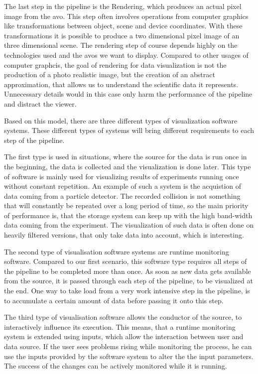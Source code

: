 The last step in the pipeline is the Rendering, which produces an actual pixel
image from the \gls{avo}. This step often involves operations from computer
graphics like transformations between object, scene and device coordinates. With
these transformations it is possible to produce a two dimensional pixel image of
an three dimensional scene. The rendering step of course depends highly on the
technologies used and the \glspl{avo} we want to display. Compared to other
usages of computer graphcis, the goal of rendering for data visualization is not
the production of a photo realistic image, but the creation of an abstract
approximation, that allows us to understand the scientific data it represents.
Unnecessary details would in this case only harm the performance of the pipeline
and distract the viewer. 

\cite{VisIdioms, UnderstDataThroughVis}

Based on this model, there are three different types of visualization software
systems. These different types of systems will bring different requirements to
each step of the pipeline.

The first type is used in situations, where the source for the data is run once
in the beginning, the data is collected and the visualization is done later.
This type of software is mainly used for visualizing results of experiments
running once without constant repetition. An example of such a system is the
acquistion of data coming from a particle detector. The recorded collision is
not something that will constantly be repeated over a long period of time, so
the main priority of performance is, that the storage system can keep up with
the high band-width data coming from the experiment. The visualization of such
data is often done on heavily filtered versions, that only take data into
account, which is interesting.

The second type of visualisation software systems are runtime monitoring
software. Compared to our first scenario, this software type requires all steps
of the pipeline to be completed more than once. As soon as new data gets
available from the source, it is passed through each step of the pipeline, to be
visualized at the end. One way to take load from a very work intensive step in
the pipeline, is to accumulate a certain amount of data before passing it onto
this step.

The third type of visualisation software allows the conductor of the source, to
interactively influence its execution. This means, that a runtime monitoring
system is extended using inputs, which allow the interaction between user and
data source. If the user sees problems rising while monitoring the process, he
can use the inputs provided by the software system to alter the the input
parameters. The success of the changes can be actively monitored while it is
running.

